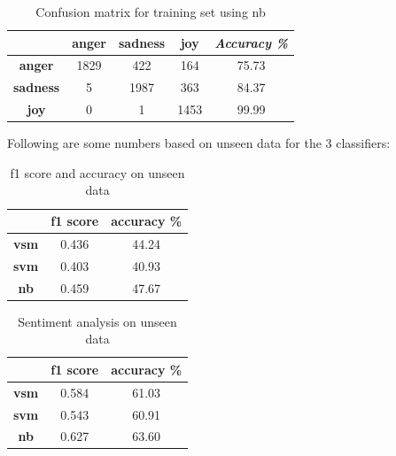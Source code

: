 \begin{table}[ht!]
  \centering
  \label{tab-confusion-nb}
  \begin{tabular}{c|c|c|c|c}
  & \textbf{anger} & \textbf{sadness} & \textbf{joy} & \emph{Accuracy \%}\\
  \hline
  \textbf{anger} & 1829 & 422 & 164 & 75.73 \\
  \textbf{sadness} & 5 & 1987 & 363 & 84.37 \\
  \textbf{joy} & 0 & 1 & 1453 & 99.99 \\
  \end{tabular}
  \caption{Confusion matrix for training set using nb}
\end{table}
\newpage
Following are some numbers based on unseen data for the 3 classifiers:

\begin{table}[ht!]
  \centering
  \label{tab-f1score}
  \begin{tabular}{c|c|c}
  & \textbf{f1 score} & \textbf{accuracy \%} \\
  \hline
  \textbf{vsm} & 0.436 & 44.24 \\
  \textbf{svm} & 0.403 & 40.93 \\
  \textbf{nb} & 0.459 & 47.67 \\
  \end{tabular}
  \caption{f1 score and accuracy on unseen data}
\end{table}

\begin{table}[ht!]
  \centering
  \label{tab-sentiment}
  \begin{tabular}{c|c|c}
  & \textbf{f1 score} & \textbf{accuracy \%} \\
  \hline
  \textbf{vsm}  & 0.584 & 61.03 \\
  \textbf{svm} &  0.543 & 60.91 \\
  \textbf{nb} & 0.627& 63.60 \\
  \end{tabular}
  \caption{Sentiment analysis on unseen data }
\end{table}


